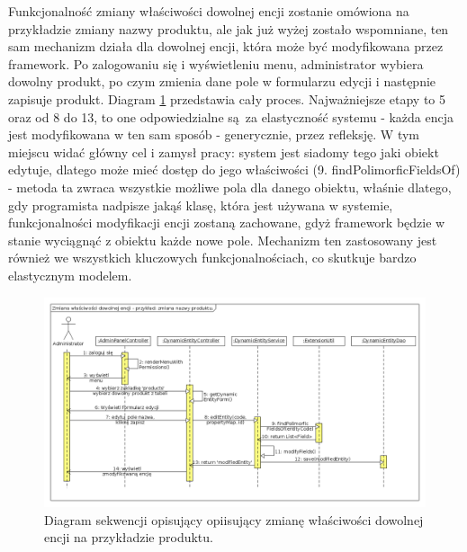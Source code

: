 Funkcjonalność zmiany właściwości dowolnej encji zostanie omówiona na przykładzie zmiany nazwy produktu, ale jak już wyżej zostało wspomniane, ten sam mechanizm działa dla dowolnej encji, która może być modyfikowana przez framework. Po zalogowaniu się i wyświetleniu menu, administrator wybiera dowolny produkt, po czym zmienia dane pole w formularzu edycji i następnie zapisuje produkt. Diagram \ref{zmianaWlEncji} przedstawia cały proces. Najważniejsze etapy to 5 oraz od 8 do 13, to one odpowiedzialne są za elastyczność systemu - każda encja jest modyfikowana w ten sam sposób - generycznie, przez refleksję. W tym miejscu widać główny cel i zamysł pracy: system jest siadomy tego jaki obiekt edytuje, dlatego może mieć dostęp do jego właściwości (9. findPolimorficFieldsOf) - metoda ta zwraca wszystkie możliwe pola dla danego obiektu, właśnie dlatego, gdy programista nadpisze jakąś klasę, która jest używana w systemie, funkcjonalności modyfikacji encji zostaną zachowane, gdyż framework będzie w stanie wyciągnąć z obiektu każde nowe pole. Mechanizm ten zastosowany jest również we wszystkich kluczowych funkcjonalnościach, co skutkuje bardzo elastycznym modelem.
\begin{figure}
	\begin{center}
		\includegraphics[scale=0.4]{zmianaWlEncji.png}
	\end{center}
	\caption{{\color{black}Diagram sekwencji opisujący opiisujący zmianę właściwości dowolnej encji na przykładzie produktu.}} \label{zmianaWlEncji}
\end{figure}

